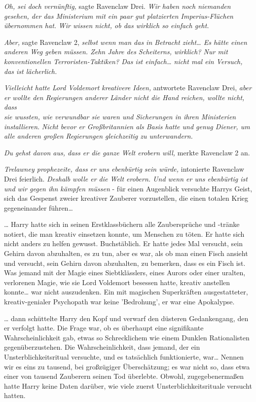 {\emph{Oh, sei doch vernünftig,} sagte Ravenclaw Drei. \emph{Wir haben noch niemanden gesehen, der das Ministerium mit ein paar gut platzierten Imperius-Flüchen übernommen hat.} \emph{Wir wissen nicht, ob das wirklich so einfach geht.}

\emph{Aber,} sagte Ravenclaw 2, \emph{selbst wenn man das in Betracht zieht… Es hätte einen anderen Weg geben müssen. Zehn Jahre des Scheiterns, wirklich? Nur mit konventionellen Terroristen-Taktiken? Das ist einfach… nicht mal ein Versuch, das ist lächerlich.}

\emph{Vielleicht hatte Lord Voldemort kreativere Ideen,} antwortete Ravenclaw Drei, \emph{aber er wollte den Regierungen anderer Länder nicht die Hand reichen, wollte nicht, dass}\\ \emph{sie wussten, wie verwundbar sie waren und Sicherungen in ihren Ministerien installieren}. \emph{Nicht bevor er Großbritannien als Basis hatte und genug Diener, um alle anderen großen Regierungen gleichzeitig zu unterwandern.}

\emph{Du gehst davon aus, dass er die ganze Welt erobern will,} merkte Ravenclaw 2 an.

\emph{Trelawney prophezeite, dass er uns ebenbürtig sein würde,} intonierte Ravenclaw Drei feierlich. \emph{Deshalb wolle er die Welt erobern. Und wenn er uns ebenbürtig ist und wir gegen ihn kämpfen müssen} - für einen Augenblick versuchte Harrys Geist, sich das Gespenst zweier kreativer Zauberer vorzustellen, die einen totalen Krieg gegeneinander führen…

… Harry hatte sich in seinen Erstklassbüchern alle Zaubersprüche und -tränke notiert, die man kreativ einsetzen konnte, um Menschen zu töten. Er hatte sich nicht anders zu helfen gewusst. Buchstäblich. Er hatte jedes Mal versucht, sein Gehirn davon abzuhalten, es zu tun, aber es war, als ob man einen Fisch ansieht und versucht, sein Gehirn davon abzuhalten, zu bemerken, dass es ein Fisch ist. Was jemand mit der Magie eines Siebtklässlers, eines Aurors oder einer uralten, verlorenen Magie, wie sie Lord Voldemort besessen hatte, kreativ anstellen konnte… war nicht auszudenken. Ein mit magischen Superkräften ausgestatteter, kreativ-genialer Psychopath war keine 'Bedrohung', er war eine Apokalypse.

… dann schüttelte Harry den Kopf und verwarf den düsteren Gedankengang, den er verfolgt hatte. Die Frage war, ob es überhaupt eine signifikante Wahrscheinlichkeit gab, etwas so Schrecklichem wie einem Dunklen Rationalisten gegenüberzustehen. Die Wahrscheinlichkeit, dass jemand, der ein Unsterblichkeitsritual versuchte, und es tatsächlich funktionierte, war… Nennen wir es eins zu tausend, bei großzügiger Überschätzung; es war nicht so, dass etwa einer von tausend Zauberern seinen Tod überlebte. Obwohl, zugegebenermaßen hatte Harry keine Daten darüber, wie viele zuerst Unsterblichkeitsrituale versucht hatten.

}
